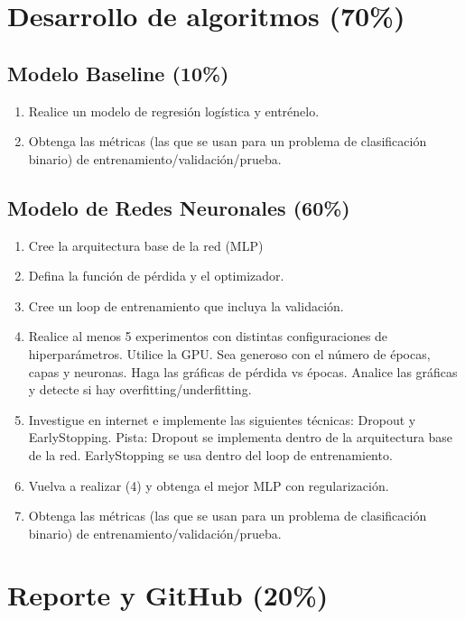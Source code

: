 \documentclass[12pt,a4paper]{article}
\begin{document}
\section{Desarrollo de algoritmos (70\%)}

\subsection{Modelo Baseline (10\%)}
\begin{enumerate}
\item Realice un modelo de regresión logística y entrénelo.
\item Obtenga las métricas (las que se usan para un problema de clasificación binario) de entrenamiento/validación/prueba.
\end{enumerate}

\subsection{Modelo de Redes Neuronales (60\%)}
\begin{enumerate}
\item Cree la arquitectura base de la red (MLP)
\item Defina la función de pérdida y el optimizador.
\item Cree un loop de entrenamiento que incluya la validación.
\item Realice al menos 5 experimentos con distintas configuraciones de hiperparámetros. Utilice la GPU. Sea generoso con el número de épocas, capas y neuronas. Haga las gráficas de pérdida vs épocas. Analice las gráficas y detecte si hay overfitting/underfitting.
\item Investigue en internet e implemente las siguientes técnicas: Dropout y EarlyStopping. Pista: Dropout se implementa dentro de la arquitectura base de la red. EarlyStopping se usa dentro del loop de entrenamiento.
\item Vuelva a realizar (4) y obtenga el mejor MLP con regularización.
\item Obtenga las métricas (las que se usan para un problema de clasificación binario) de entrenamiento/validación/prueba.
\end{enumerate}

\section{Reporte y GitHub (20\%)}
\end{document}
